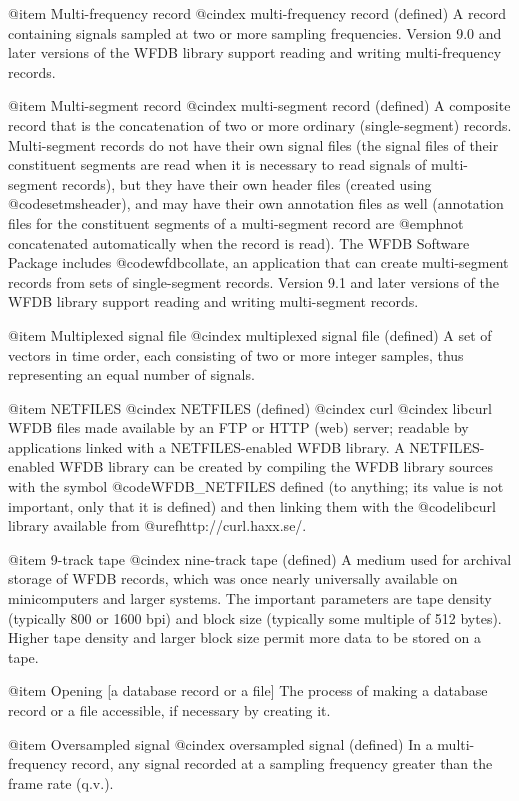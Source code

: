 {{{{{{{{@item Multi-frequency record
@cindex multi-frequency record (defined)
A record containing signals sampled at two or more sampling frequencies.
Version 9.0 and later versions of the WFDB library support reading and
writing multi-frequency records.

@item Multi-segment record
@cindex multi-segment record (defined)
A composite record that is the concatenation of two or more ordinary
(single-segment) records.  Multi-segment records do not have their own
signal files (the signal files of their constituent segments are read
when it is necessary to read signals of multi-segment records), but they
have their own header files (created using @code{setmsheader}),
and may have their own annotation files as well (annotation files for
the constituent segments of a multi-segment record are @emph{not}
concatenated automatically when the record is read).  The WFDB Software
Package includes @code{wfdbcollate}, an
application that can create multi-segment records from sets of
single-segment records.  Version 9.1 and later versions of the WFDB
library support reading and writing multi-segment records.

@item Multiplexed signal file
@cindex multiplexed signal file (defined)
A set of vectors in time order, each consisting of two or more integer
samples, thus representing an equal number of signals.

@item NETFILES
@cindex NETFILES (defined)
@cindex curl
@cindex libcurl
WFDB files made available by an FTP or HTTP (web) server;  readable
by applications linked with a NETFILES-enabled WFDB library.  A
NETFILES-enabled WFDB library can be created by compiling the WFDB
library sources with the symbol @code{WFDB_NETFILES} defined (to anything;
its value is not important, only that it is defined) and then linking
them with the @code{libcurl} library available from
@uref{http://curl.haxx.se/}.

@item 9-track tape
@cindex nine-track tape (defined)
A medium used for archival storage of WFDB records, which was once nearly
universally available on minicomputers and larger systems.  The
important parameters are tape density (typically 800 or 1600 bpi) and
block size (typically some multiple of 512 bytes).  Higher tape density
and larger block size permit more data to be stored on a tape.

@item Opening [a database record or a file]
The process of making a database record or a file accessible, if
necessary by creating it.

@item Oversampled signal
@cindex oversampled signal (defined)
In a multi-frequency record, any signal recorded at a sampling frequency
greater than the frame rate (q.v.).

}}}}}}}}
